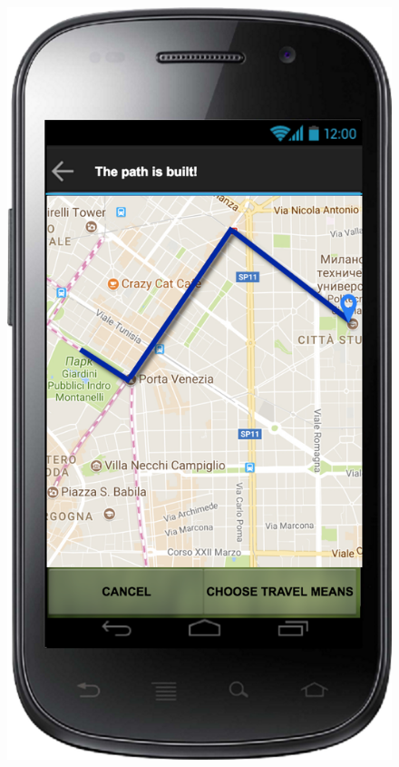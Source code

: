 \documentclass[a4paper,leqno]{article}
\begin{document}
\begin{figure}
	\begin{minipage}[!h]{0.45\linewidth}
		\centering
		\includegraphics[scale = 0.15]{buildPath.png}
	\end{minipage}
	\hspace{0.5cm}
	\begin{minipage}[!h]{0.45\linewidth}

\end{minipage}
\end{figure}
\end{document}
